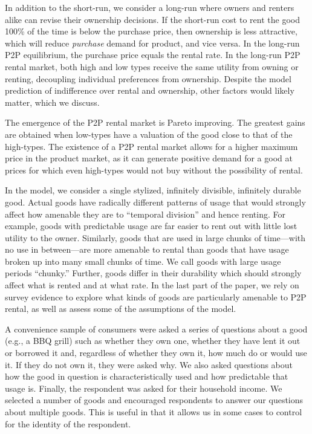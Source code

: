 \documentclass[11pt]{article}
\begin{document}
In addition to the short-run, we consider a long-run where owners and renters alike can revise their ownership decisions. 
If the short-run cost to rent the good 100\% of the time is below the purchase price, then ownership is less attractive, which will reduce \emph{purchase} demand for product, and vice versa. 
In the long-run P2P equilibrium, the purchase price equals the rental rate.  
In the long-run P2P rental market, both high and low types receive the same utility from owning or renting, decoupling individual preferences from ownership. 
Despite the model prediction of indifference over rental and ownership, other factors would likely matter, which we discuss. 

The emergence of the P2P rental market is Pareto improving. 
The greatest gains are obtained when low-types have a valuation of the good close to that of the high-types. 
The existence of a P2P rental market allows for a higher maximum price in the product market, as it can generate positive demand for a good at prices for which even high-types would not buy without the possibility of rental. 

In the model, we consider a single stylized, infinitely divisible, infinitely durable good.  
Actual goods have radically different patterns of usage that would strongly affect how amenable they are to ``temporal division'' and hence renting.
For example, goods with predictable usage are far easier to rent out with little lost utility to the owner. 
Similarly, goods that are used in large chunks of time---with no use in between---are more amenable to rental than goods that have usage broken up into many small chunks of time.
We call goods with large usage periods ``chunky.'' 
Further, goods differ in their durability which should strongly affect what is rented and at what rate. 
In the last part of the paper, we rely on survey evidence to explore what kinds of goods are particularly amenable to P2P rental, as well as assess some of the assumptions of the model. 

A convenience sample of consumers were asked a series of questions about a good (e.g., a BBQ grill) such as whether they own one, whether they have lent it out or borrowed it and, regardless of whether they own it, how much do or would use it. 
If they do not own it, they were asked why. 
We also asked questions about how the good in question is characteristically used and how predictable that usage is. 
Finally, the respondent was asked for their household income.  
We selected a number of goods and encouraged respondents to answer our questions about multiple goods.
This is useful in that it allows us in some cases to control for the identity of the respondent. 
\end{document}
